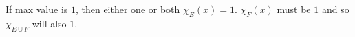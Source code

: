 \documentclass[preview]{standalone}
\begin{document}
\begin{center}
If max value is $1$, then either one or both $\chi_{E}(x)=1$. $\chi_F(x)$ must be $1$ and so $\chi_{E \cup F}$ will also $1$.
\end{center}
\end{document}
